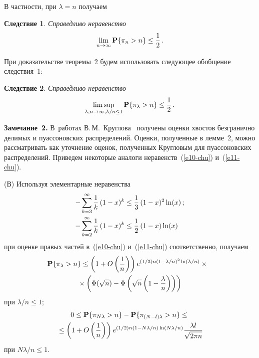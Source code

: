 \begin{multicols}{2}
В частности, при $\lambda=n$ получаем

\smallskip

\noindent
\textbf{Следствие 1}. \textit{Справедливо неравенство 
$$
\lim_{n\to\infty}{\bf P}\{\pi_{n}>n\}\le\displaystyle\frac{\displaystyle 1\mathstrut}{\displaystyle 2\mathstrut}\,.
$$}


\medskip

При доказательстве теоремы~2  будем использовать следующее обобщение
следствия~1:

\smallskip

\noindent
\textbf{Следствие 2}. \textit{Справедливо неравенство 
$$
\limsup\limits_{\lambda,n\to\infty, {\lambda}/{n}\le 1}\mathbf{P}\{
\pi_{\lambda}>n\}\le\displaystyle\frac{\displaystyle 1\mathstrut}{\displaystyle 2\mathstrut}\,.
$$
}

\smallskip


\noindent
\textbf{Замечание~2.} В~работах В.\,М.~Круглова~\cite{7-chu, 8-chu} получены оценки
хвостов безгранично делимых и пуассоновских распределений. Оценки,
полученные в лемме~2, можно рассматривать как уточнение оценок,
полученных Кругловым для пуассоновских распределений. Приведем
некоторые аналоги неравенств~(\ref{e10-chu}) и~(\ref{e11-chu}).

(В) Используя элементарные неравенства
\begin{align*}
-\sum\limits_{k=3}^{\infty}\displaystyle\frac{\displaystyle 1\mathstrut}{\displaystyle k\mathstrut}\,(1-x)^k&\le \displaystyle\frac{\displaystyle 1\mathstrut}{\displaystyle 3\mathstrut}\,(1-x)^2\ln(x)\,;\\
-\sum\limits_{k=2}^{\infty}\displaystyle\frac{\displaystyle 1\mathstrut}{\displaystyle k\mathstrut}\,(1-x)^k&\le \displaystyle\frac{\displaystyle 1\mathstrut}{\displaystyle 2\mathstrut}\,(1-x)\ln(x)
\end{align*}
при оценке правых частей в~(\ref{e10-chu}) и~(\ref{e11-chu}) соответственно, получаем
\begin{multline*}
\!\!\!\mathbf{P}\{\pi_{\lambda}>n\}\le\left(1+O\left(\displaystyle\frac{\displaystyle 1\mathstrut}{\displaystyle n\mathstrut}\right)\right)
e^{({1}/{3})n\left(1-{\lambda}/{n}\right)^2\ln\left(\lambda/n\right)}\times{}\\
{}\times
\left(\Phi(\sqrt{n})-\Phi\left(\sqrt{n}\left(1-\displaystyle\frac{\displaystyle \lambda\mathstrut}{\displaystyle n\mathstrut}\right)\right)\right)
\end{multline*}
при   ${\lambda}/{n}\le 1$;
\begin{multline*}
0\le \mathbf{P}\{\pi_{N\lambda}>n\}-\mathbf{P}\{\pi_{(N-l)\lambda}>n\}\le{}\\
{}\le
\left(1+O\left(\displaystyle\frac{\displaystyle 1\mathstrut}{\displaystyle n\mathstrut}\right)\right)e^{({1}/{2})n\left(1-{N\lambda}/{n}\right)
\ln\left({N\lambda}/{n}\right)}
\displaystyle\frac{\displaystyle \lambda l\mathstrut}{\displaystyle \sqrt{2\pi n}\mathstrut}
\end{multline*}
при   ${N\lambda}/{n}\le 1$.


\end{multicols}
